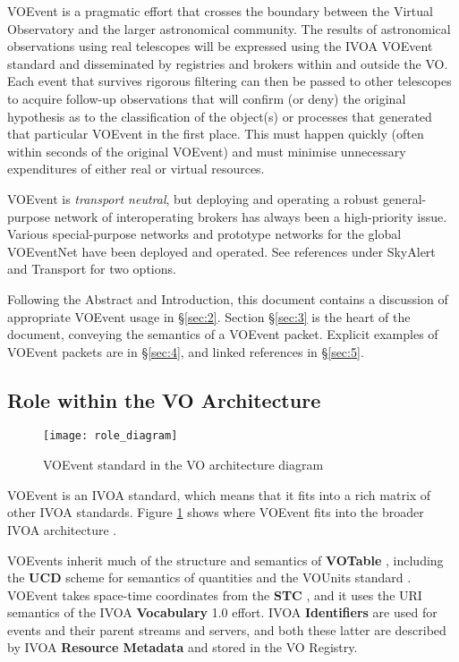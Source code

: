 \documentclass[11pt,a4paper]{ivoa}
\begin{document}
VOEvent is a pragmatic effort that crosses the boundary between the Virtual
Observatory and the larger astronomical community. The results of astronomical
observations using real telescopes will be expressed using the IVOA VOEvent
standard and disseminated by registries and brokers within and outside the VO.
Each event that survives rigorous filtering can then be passed to other
telescopes to acquire follow-up observations that will confirm (or deny) the
original hypothesis as to the classification of the object(s) or processes that
generated that particular VOEvent in the first place. This must happen quickly
(often within seconds of the original VOEvent) and must minimise unnecessary
expenditures of either real or virtual resources.

VOEvent is \emph{transport neutral}, but deploying and operating a robust
general-purpose network of interoperating brokers has always been a
high-priority issue. Various special-purpose networks and prototype networks
for the global VOEventNet have been deployed and operated. See references under
SkyAlert \citep{bib05} and Transport \citep{bib33} for two options.

Following the Abstract and Introduction, this document contains a discussion of
appropriate VOEvent usage in \S\ref{sec:2}. Section \S\ref{sec:3} is the heart
of the document, conveying the semantics of a VOEvent packet. Explicit examples
of VOEvent packets are in \S\ref{sec:4}, and linked references in \S\ref{sec:5}.

\subsection{Role within the VO Architecture}

\begin{figure}[ht!]
\centering\texttt{[image: role\_diagram]}
\caption{VOEvent standard in the VO architecture diagram}
\label{fig:diagram}
\end{figure}

VOEvent is an IVOA standard, which means that it fits into a rich matrix of
other IVOA standards. Figure \ref{fig:diagram} shows where VOEvent fits into
the broader IVOA architecture \citep{2021ivoa.spec.1101D}.

VOEvents inherit much of the structure and semantics of \textbf{VOTable}
\citep{2019ivoa.spec.1021O}, including the \textbf{UCD}
\citep{2018ivoa.spec.0527P} scheme for semantics of quantities and the VOUnits
standard \citep{2023ivoa.spec.1215G}. VOEvent takes space-time coordinates from
the \textbf{STC} \citep{2007ivoa.spec.1030R}, and it uses the URI semantics of the
IVOA \textbf{Vocabulary} 1.0 \citep{2009ivoa.spec.1007G} effort. IVOA 
\textbf{Identifiers} \citep{2016ivoa.spec.0523D} are used for events and their
parent streams and servers, and both these latter are described by IVOA
\textbf{Resource Metadata} \citep{2007ivoa.spec.0302H} and stored in the VO
Registry.
\end{document}
